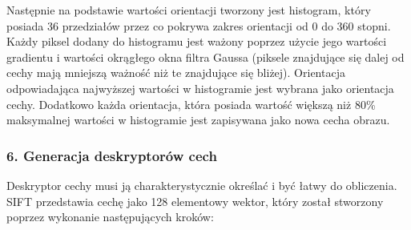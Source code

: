 Następnie na podstawie wartości orientacji tworzony jest histogram, który posiada 36 przedziałów przez co pokrywa zakres orientacji od 0 do 360 stopni. Każdy piksel dodany do histogramu jest ważony poprzez użycie jego wartości gradientu i wartości okrągłego okna filtra Gaussa (piksele znajdujące się dalej od cechy mają mniejszą ważność niż te znajdujące się bliżej). Orientacja odpowiadająca najwyższej wartości w histogramie jest wybrana jako orientacja cechy. Dodatkowo każda orientacja, która posiada wartość większą niż 80\% maksymalnej wartości w histogramie jest zapisywana jako nowa cecha obrazu.

\subsubsection{6. Generacja deskryptorów cech}
\label{sec:proponowane_algorytmy:deskryptor}

Deskryptor cechy musi ją charakterystycznie określać i być łatwy do obliczenia. SIFT przedstawia cechę jako 128 elementowy wektor, który został stworzony poprzez wykonanie następujących kroków:

